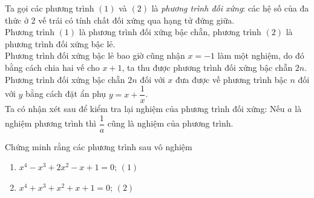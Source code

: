 \begin{vd}
{\begin{note}
Ta gọi các phương trình $(1)$ và $(2)$ là \textit{phương trình đối xứng}: các hệ số của đa thức ở $2$ vế trái có tính chất đối xứng qua hạng tử đứng giữa.\\
Phương trình $(1)$ là phương trình đối xứng bậc chẵn, phương trình $(2)$ là phương trình đối xứng bậc lẻ.\\
Phương trình đối xứng bậc lẻ bao giờ cũng nhận $x=-1$ làm một nghiệm, do đó bằng cách chia hai vế cho $x+1$, ta thu được phương trình đối xứng bậc chẵn $2n$.\\
Phương trình đối xứng bậc chẵn $2n$ đối với $x$ đưa được về phương trình bậc $n$ đối với $y$ bằng cách đặt ẩn phụ $y=x+\dfrac{1}{x}$.\\
Ta có nhận xét sau để kiểm tra lại nghiệm của phương trình đối xứng: Nếu $a$ là nghiệm phương trình thì $\dfrac{1}{a}$ cũng là nghiệm của phương trình.
\end{note}

}
\end{vd}

\begin{vd}%
	Chứng minh rằng các phương trình sau vô nghiệm
	\begin{enumerate}
	\item $x^4-x^3+2x^2-x+1=0$;	\qquad\qquad $(1)$
	\item $x^4+x^3+x^2+x+1=0$; \qquad\qquad $(2)$
	\end{enumerate}
\end{vd}

